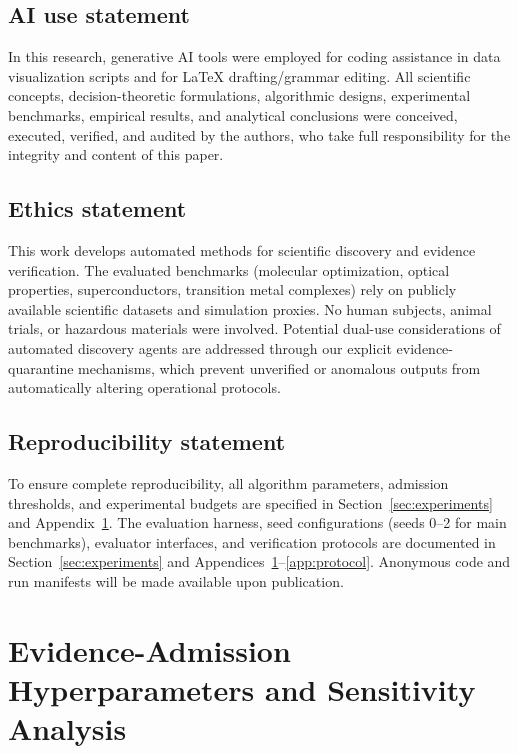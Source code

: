 \documentclass{article}
\begin{document}
\clearpage
\subsection*{AI use statement}
In this research, generative AI tools were employed for coding assistance in data visualization scripts and for LaTeX drafting/grammar editing. All scientific concepts, decision-theoretic formulations, algorithmic designs, experimental benchmarks, empirical results, and analytical conclusions were conceived, executed, verified, and audited by the authors, who take full responsibility for the integrity and content of this paper.

\subsection*{Ethics statement}
This work develops automated methods for scientific discovery and evidence verification. The evaluated benchmarks (molecular optimization, optical properties, superconductors, transition metal complexes) rely on publicly available scientific datasets and simulation proxies. No human subjects, animal trials, or hazardous materials were involved. Potential dual-use considerations of automated discovery agents are addressed through our explicit evidence-quarantine mechanisms, which prevent unverified or anomalous outputs from automatically altering operational protocols.

\subsection*{Reproducibility statement}
To ensure complete reproducibility, all algorithm parameters, admission thresholds, and experimental budgets are specified in Section~\ref{sec:experiments} and Appendix~\ref{app:hyperparams}. The evaluation harness, seed configurations (seeds 0--2 for main benchmarks), evaluator interfaces, and verification protocols are documented in Section~\ref{sec:experiments} and Appendices~\ref{app:hyperparams}--\ref{app:protocol}. Anonymous code and run manifests will be made available upon publication.




\newpage
\appendix
\onecolumn

\section{Evidence-Admission Hyperparameters and Sensitivity Analysis}
\label{app:hyperparams}
\end{document}

